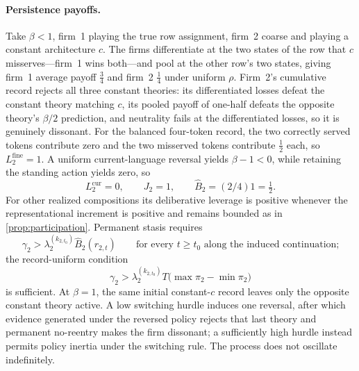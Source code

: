 \documentclass[11pt]{article}
\theoremstyle{definition}
\begin{document}
\paragraph{Persistence payoffs.}
Take $\beta<1$, firm~1 playing the true row assignment, firm~2 coarse and playing a constant architecture $c$.
The firms differentiate at the two states of the row that $c$ misserves---firm~1 wins both---and pool at the other row's two states, giving firm~1 average payoff $\tfrac34$ and firm~2 $\tfrac14$ under uniform $\rho$.
Firm~2's cumulative record rejects all three constant theories: its differentiated losses defeat the constant theory matching $c$, its pooled payoff of one-half defeats the opposite theory's $\beta/2$ prediction, and neutrality fails at the differentiated losses, so it is genuinely dissonant.
For the balanced four-token record, the two correctly served tokens contribute zero and the two misserved tokens contribute $\tfrac12$ each, so $L_2^{\mathrm{fine}}=1$.
A uniform current-language reversal yields $\beta-1<0$, while retaining the standing action yields zero, so
\[
L_2^{\mathrm{cur}}=0,\qquad
J_2=1,\qquad
\widehat B_2=(2/4)1=\tfrac12.
\]
For other realized compositions its deliberative leverage is positive whenever the representational increment is positive and remains bounded as in \cref{prop:participation}.
Permanent stasis requires
\[
\gamma_2
>
\lambda_2^{(k_{2,t_0})}
\widehat B_2(r_{2,t})
\qquad
\text{for every \(t\ge t_0\) along the induced continuation;}
\]
the record-uniform condition
\[
\gamma_2
>
\lambda_2^{(k_{2,t_0})}
T\bigl(\max\pi_2-\min\pi_2\bigr)
\]
is sufficient.
At \(\beta=1\), the same initial constant-\(c\) record leaves only the opposite constant theory active.
A low switching hurdle induces one reversal, after which evidence generated under the reversed policy rejects that last theory and permanent no-reentry makes the firm dissonant; a sufficiently high hurdle instead permits policy inertia under the switching rule.
The process does not oscillate indefinitely.
\end{document}
